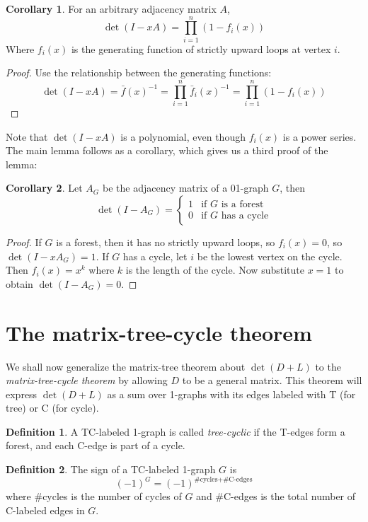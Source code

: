 \documentclass[a4paper, 11pt]{article}
\theoremstyle{definition}
\newtheorem{definition}{Definition}[section]
\newtheorem{corollary}{Corollary}[theorem]
\begin{document}
\begin{corollary} For an arbitrary adjacency matrix $A$,
  \[ \det(I - xA) = \prod_{i = 1}^n (1 - f_i(x)) \]
  Where $f_i(x)$ is the generating function of strictly upward loops at vertex $i$.
\end{corollary}
\begin{proof}
  Use the relationship between the generating functions:
  \[
    \det(I - xA) = \bar{f}(x)^{-1} = \prod_{i=1}^n \bar{f}_i(x)^{-1} = \prod_{i=1}^n (1 - f_i(x))
  \]
\end{proof}

Note that $\det(I - xA)$ is a polynomial, even though $f_i(x)$ is a power series. The main lemma follows as a corollary, which gives us a third proof of the lemma:

\begin{corollary}
  Let $A_G$ be the adjacency matrix of a 01-graph $G$, then
  \[
    \det(I-A_G) = \begin{cases}
      1 & \text{if $G$ is a forest}\\
      0 & \text{if $G$ has a cycle}
    \end{cases}
  \]
\end{corollary}
\begin{proof}
  If $G$ is a forest, then it has no strictly upward loops, so $f_i(x) = 0$, so $\det(I - xA_G) = 1$. If $G$ has a cycle, let $i$ be the lowest vertex on the cycle. Then $f_i(x) = x^k$ where $k$ is the length of the cycle. Now substitute $x = 1$ to obtain $\det(I - A_G) = 0$.
\end{proof}

\section{The matrix-tree-cycle theorem}

We shall now generalize the matrix-tree theorem about $\det(D + L)$ to the \emph{matrix-tree-cycle theorem} by allowing $D$ to be a general matrix. This theorem will express $\det(D + L)$ as a sum over 1-graphs with its edges labeled with T (for tree) or C (for cycle).

\begin{definition}
  A TC-labeled 1-graph is called \emph{tree-cyclic} if the T-edges form a forest, and each C-edge is part of a cycle.
\end{definition}

\begin{definition}
  The sign of a TC-labeled 1-graph $G$ is
  \[
   (-1)^{G} = (-1)^{\text{\#cycles} + \text{\#C-edges}}
  \]
  where \#cycles is the number of cycles of $G$ and \#C-edges is the total number of C-labeled edges in $G$.
\end{definition}
\end{document}
